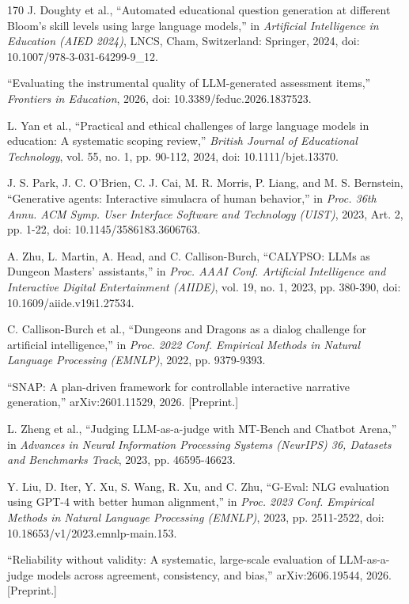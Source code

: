 \begin{thebibliography}{170}
 J. Doughty et al., ``Automated educational question generation at different Bloom's skill levels using large language models,'' in \textit{Artificial Intelligence in Education (AIED 2024)}, LNCS, Cham, Switzerland: Springer, 2024, doi: 10.1007/978-3-031-64299-9\_12.

 ``Evaluating the instrumental quality of LLM-generated assessment items,'' \textit{Frontiers in Education}, 2026, doi: 10.3389/feduc.2026.1837523.

 L. Yan et al., ``Practical and ethical challenges of large language models in education: A systematic scoping review,'' \textit{British Journal of Educational Technology}, vol. 55, no. 1, pp. 90-112, 2024, doi: 10.1111/bjet.13370.

 J. S. Park, J. C. O'Brien, C. J. Cai, M. R. Morris, P. Liang, and M. S. Bernstein, ``Generative agents: Interactive simulacra of human behavior,'' in \textit{Proc. 36th Annu. ACM Symp. User Interface Software and Technology (UIST)}, 2023, Art. 2, pp. 1-22, doi: 10.1145/3586183.3606763.

 A. Zhu, L. Martin, A. Head, and C. Callison-Burch, ``CALYPSO: LLMs as Dungeon Masters' assistants,'' in \textit{Proc. AAAI Conf. Artificial Intelligence and Interactive Digital Entertainment (AIIDE)}, vol. 19, no. 1, 2023, pp. 380-390, doi: 10.1609/aiide.v19i1.27534.

 C. Callison-Burch et al., ``Dungeons and Dragons as a dialog challenge for artificial intelligence,'' in \textit{Proc. 2022 Conf. Empirical Methods in Natural Language Processing (EMNLP)}, 2022, pp. 9379-9393.

 ``SNAP: A plan-driven framework for controllable interactive narrative generation,'' arXiv:2601.11529, 2026. [Preprint.]

 L. Zheng et al., ``Judging LLM-as-a-judge with MT-Bench and Chatbot Arena,'' in \textit{Advances in Neural Information Processing Systems (NeurIPS) 36, Datasets and Benchmarks Track}, 2023, pp. 46595-46623.

 Y. Liu, D. Iter, Y. Xu, S. Wang, R. Xu, and C. Zhu, ``G-Eval: NLG evaluation using GPT-4 with better human alignment,'' in \textit{Proc. 2023 Conf. Empirical Methods in Natural Language Processing (EMNLP)}, 2023, pp. 2511-2522, doi: 10.18653/v1/2023.emnlp-main.153.

 ``Reliability without validity: A systematic, large-scale evaluation of LLM-as-a-judge models across agreement, consistency, and bias,'' arXiv:2606.19544, 2026. [Preprint.]


\end{thebibliography}
